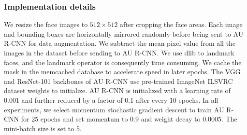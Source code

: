 \documentclass[5p,twocolumn]{elsarticle}
\begin{document}
\subsubsection{Implementation details} 
We resize the face images to $512 \times 512$ after cropping the face areas. Each image and bounding boxes are horizontally mirrored randomly before being sent to AU R-CNN for data augmentation. We subtract the mean pixel value from all the images in the dataset before sending to AU R-CNN. We use dlib \cite{king2009dlib} to landmark faces, and the landmark operator is consequently time consuming. We cache the mask in the memcached database to accelerate speed in later epochs. The VGG and ResNet-101 backbones of AU R-CNN use pre-trained ImageNet ILSVRC dataset \cite{deng2009imagenet} weights to initialize. AU R-CNN is initialized with a learning rate of 0.001 and further reduced by a factor of 0.1 after every 10 epochs. In all experiments, we select momentum stochastic gradient descent to train AU R-CNN for 25 epochs and set momentum to 0.9 and weight decay to 0.0005. The mini-batch size is set to 5.
\end{document}
